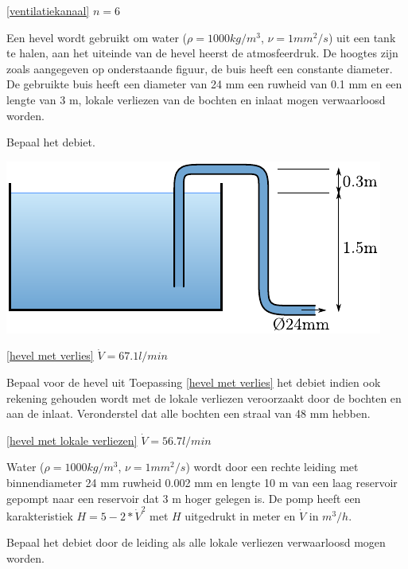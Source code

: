 \begin{antwoord}{\ref{ventilatiekanaal}}
	$n = 6$
\end{antwoord}
\begin{toepassing}
	\label{hevel met verlies}
Een hevel wordt gebruikt om water ($\rho=1000\unit{kg/m^3}$, $\nu=1\unit{mm^2/s}$) uit een tank te halen, aan het uiteinde van de hevel heerst de atmosfeerdruk. De hoogtes zijn zoals aangegeven op onderstaande figuur, de buis heeft een constante diameter. De gebruikte buis heeft een diameter van 24 mm een ruwheid van 0.1 mm en een lengte van 3 m, lokale verliezen van de bochten en inlaat mogen verwaarloosd worden.
		
Bepaal het debiet.

	\centering
	\includegraphics{fig/stroming_in_leidingen/hevel}
\end{toepassing}
\begin{antwoord}{\ref{hevel met verlies}}
	$\dot{V} = 67.1\unit{l/min}$
\end{antwoord}
\begin{toepassing}[*]
	\label{hevel met lokale verliezen}
Bepaal voor de hevel uit Toepassing \ref{hevel met verlies} het debiet indien ook rekening gehouden wordt met de lokale verliezen veroorzaakt door de bochten en aan de inlaat. Veronderstel dat alle bochten een straal van 48 mm hebben.

\end{toepassing}
\begin{antwoord}{\ref{hevel met lokale verliezen}}
	$\dot{V} = 56.7\unit{l/min}$
\end{antwoord}
\begin{toepassing}[*]
	\label{pompkarakteristiek}
Water ($\rho=1000\unit{kg/m^3}$, $\nu=1\unit{mm^2/s}$) wordt door een rechte leiding met binnendiameter 24 mm ruwheid 0.002 mm en lengte 10 m van een laag reservoir gepompt naar een reservoir dat 3 m hoger gelegen is. De pomp heeft een karakteristiek $H = 5 - 2*\dot{V}^2$ met $H$ uitgedrukt in meter en $\dot{V}$ in $\unit{m^3/h}$.

Bepaal het debiet door de leiding als alle lokale verliezen verwaarloosd mogen worden.
\end{toepassing}
